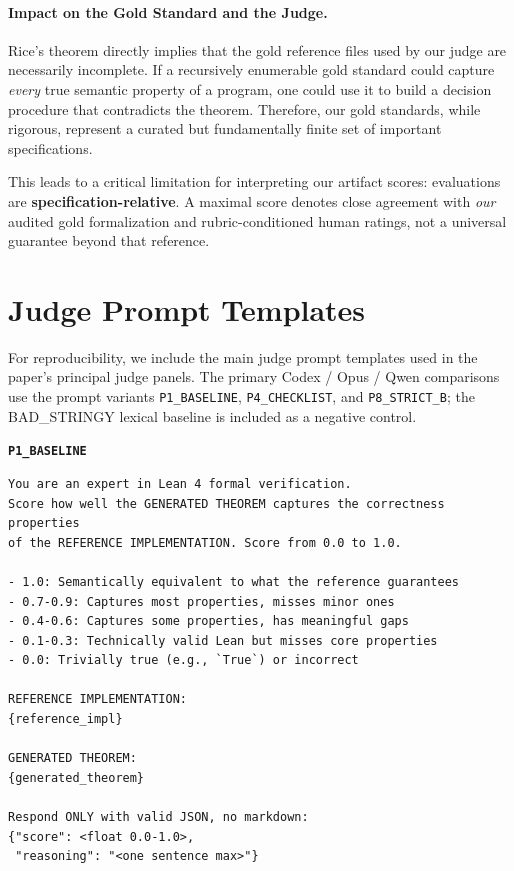 \documentclass{article}
\begin{document}
\paragraph{Impact on the Gold Standard and the Judge.}
Rice's theorem directly implies that the gold reference files used by our judge are necessarily incomplete. If a recursively enumerable gold standard could capture \emph{every} true semantic property of a program, one could use it to build a decision procedure that contradicts the theorem. Therefore, our gold standards, while rigorous, represent a curated but fundamentally finite set of important specifications.

This leads to a critical limitation for interpreting our artifact scores: evaluations are \textbf{specification-relative}. A maximal score denotes close agreement with \emph{our} audited gold formalization and rubric-conditioned human ratings, not a universal guarantee beyond that reference.

\section{Judge Prompt Templates}\label{app:judge-prompts}
For reproducibility, we include the main judge prompt templates used in the paper's principal judge panels. The primary Codex / Opus / Qwen comparisons use the prompt variants \texttt{P1\_BASELINE}, \texttt{P4\_CHECKLIST}, and \texttt{P8\_STRICT\_B}; the BAD\_STRINGY lexical baseline is included as a negative control.

\noindent\textbf{\texttt{P1\_BASELINE}}\par
\vspace{0.25em}\begin{lstlisting}[style=promptstyle]
You are an expert in Lean 4 formal verification.
Score how well the GENERATED THEOREM captures the correctness properties
of the REFERENCE IMPLEMENTATION. Score from 0.0 to 1.0.

- 1.0: Semantically equivalent to what the reference guarantees
- 0.7-0.9: Captures most properties, misses minor ones
- 0.4-0.6: Captures some properties, has meaningful gaps
- 0.1-0.3: Technically valid Lean but misses core properties
- 0.0: Trivially true (e.g., `True`) or incorrect

REFERENCE IMPLEMENTATION:
{reference_impl}

GENERATED THEOREM:
{generated_theorem}

Respond ONLY with valid JSON, no markdown:
{"score": <float 0.0-1.0>,
 "reasoning": "<one sentence max>"}
\end{lstlisting}
\end{document}
